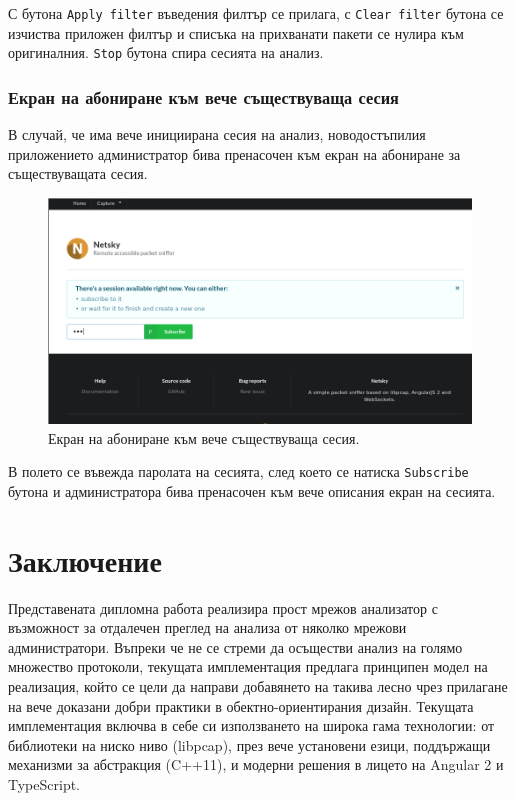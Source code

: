 \documentclass[12pt,a4paper,oneside]{book}
\begin{document}
С бутона \texttt{Apply filter} въведения филтър се
прилага, с \texttt{Clear filter} бутона се изчиства приложен филтър и списъка на
прихванати пакети се нулира към оригиналния. \texttt{Stop} бутона спира сесията
на анализ.

\subsection{Екран на абониране към вече съществуваща сесия}

В случай, че има вече инициирана сесия на анализ, новодостъпилия приложението
администратор бива пренасочен към екран на абониране за съществуващата сесия.

\begin{figure}[h!]
  \centering
  \includegraphics[width=\textwidth]{figures/screenshots/session-subscription.png}
  \caption{Екран на абониране към вече съществуваща сесия.}
  \label{capture_fig}
\end{figure}

В полето се въвежда паролата на сесията, след което се натиска
\texttt{Subscribe} бутона и администратора бива пренасочен към вече описания
екран на сесията.

\chapter{Заключение}

Представената дипломна работа реализира прост мрежов анализатор с възможност
за отдалечен преглед на анализа от няколко мрежови администратори.
Въпреки че не се стреми да осъществи анализ на голямо множество протоколи,
текущата имплементация предлага принципен модел на реализация, който се
цели да направи добавянето на такива лесно чрез прилагане на вече доказани
добри практики в обектно-ориентирания дизайн. Текущата имплементация включва
в себе си използването на широка гама технологии: от библиотеки на ниско ниво (libpcap),
през вече установени езици, поддържащи механизми за абстракция (C++11),
и модерни решения в лицето на Angular 2 и TypeScript.
\end{document}
